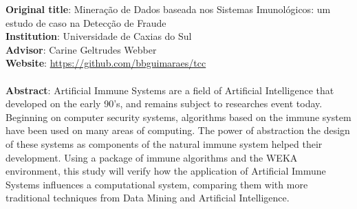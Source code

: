 \textbf{Original title}:
    Mineração de Dados baseada nos Sistemas Imunológicos: um estudo de caso
    na Detecção de Fraude \\
\textbf{Institution}: Universidade de Caxias do Sul \\
\textbf{Advisor}: Carine Geltrudes Webber \\
\textbf{Website}: \url{https://github.com/bbguimaraes/tcc}
\\\\
\textbf{Abstract}:
    Artificial Immune Systems are a field of Artificial Intelligence that
    developed on the early 90's, and remains subject to researches event today.
    Beginning on computer security systems, algorithms based on the immune
    system have been used on many areas of computing. The power of abstraction
    the design of these systems as components of the natural immune system
    helped their development. Using a package of immune algorithms and the WEKA
    environment, this study will verify how the application of Artificial
    Immune Systems influences a computational system, comparing them with more
    traditional techniques from Data Mining and Artificial Intelligence.
